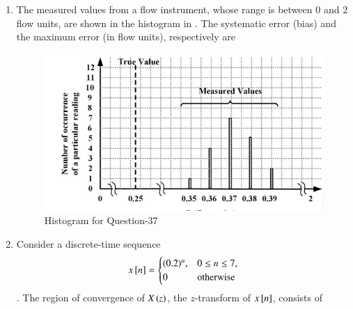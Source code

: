\documentclass[journal,12pt,onecolumn]{IEEEtran}
\theoremstyle{remark}
\begin{document}
\begin{enumerate}
\item The measured values from a flow instrument, whose range is between $0$ and $2$ flow units, are shown in the histogram in . The systematic error (bias) and the maximum error (in flow units), respectively are
\par\hfill{}
\begin{figure}[H]
    \centering
    \includegraphics[width=0.6\columnwidth]{Figs/Q-37.png}
    \caption{Histogram for Question-37}
    \label{37}
\end{figure}
    \begin{enumerate}
    \end{enumerate}

\item Consider a discrete-time sequence
$$x\sbrak{n}=
\begin{cases}
(0.2)^n,& 0 \leq n \leq 7, \\
0 &\text{otherwise}
\end{cases}$$.
The region of convergence of $X\brak{z}$, the $z$-transform of $x\sbrak{n}$, consists of
\par\hfill{}
    \begin{enumerate}
    \end{enumerate}


\end{enumerate}
\end{document}
